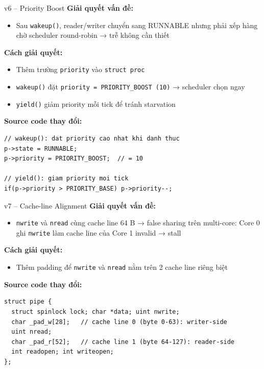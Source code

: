 \documentclass[aspectratio=169]{beamer}
\begin{document}
\begin{frame}[fragile]{v6 -- Priority Boost}
    \textbf{Giải quyết vấn đề:}
    \begin{itemize}
        \item Sau \texttt{wakeup()}, reader/writer chuyển sang RUNNABLE nhưng phải xếp hàng chờ scheduler round-robin → trễ không cần thiết
    \end{itemize}

    \vspace{0.4em}
    \textbf{Cách giải quyết:}
    \begin{itemize}\setlength\itemsep{3pt}
        \item Thêm trường \texttt{priority} vào \texttt{struct proc}
        \item \texttt{wakeup()} đặt \texttt{priority = PRIORITY\_BOOST (10)} → scheduler chọn ngay
        \item \texttt{yield()} giảm priority mỗi tick để tránh starvation
    \end{itemize}

    \vspace{0.4em}
    \textbf{Source code thay đổi:}
\begin{lstlisting}
// wakeup(): dat priority cao nhat khi danh thuc
p->state = RUNNABLE;
p->priority = PRIORITY_BOOST;  // = 10

// yield(): giam priority moi tick
if(p->priority > PRIORITY_BASE) p->priority--;
\end{lstlisting}
\end{frame}

\begin{frame}[fragile]{v7 -- Cache-line Alignment}
    \textbf{Giải quyết vấn đề:}
    \begin{itemize}
        \item \texttt{nwrite} và \texttt{nread} cùng cache line 64 B → false sharing trên multi-core: Core 0 ghi \texttt{nwrite} làm cache line của Core 1 invalid → stall
    \end{itemize}

    \vspace{0.4em}
    \textbf{Cách giải quyết:}
    \begin{itemize}
        \item Thêm padding để \texttt{nwrite} và \texttt{nread} nằm trên 2 cache line riêng biệt
    \end{itemize}

    \vspace{0.4em}
    \textbf{Source code thay đổi:}
\begin{lstlisting}
struct pipe {
  struct spinlock lock; char *data; uint nwrite;
  char _pad_w[28];   // cache line 0 (byte 0-63): writer-side
  uint nread;
  char _pad_r[52];   // cache line 1 (byte 64-127): reader-side
  int readopen; int writeopen;
};
\end{lstlisting}
\end{frame}
\end{document}
